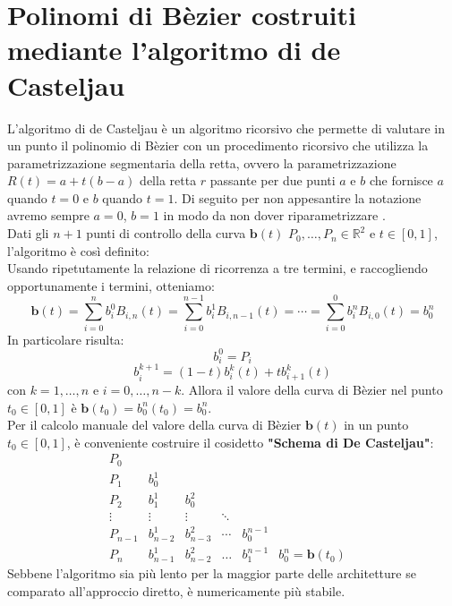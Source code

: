 \documentclass[a4paper,12pt]{report}
\theoremstyle{definition}
\begin{document}
\section{Polinomi di Bèzier costruiti mediante l'algoritmo di de Casteljau}\label{DeCasteljau}
L'algoritmo di de Casteljau è un algoritmo ricorsivo che permette di valutare in un punto il polinomio di Bèzier con un procedimento ricorsivo che utilizza la parametrizzazione segmentaria della retta, ovvero la parametrizzazione $R(t) = a + t(b - a)$ della retta $r$ passante per due punti $a$ e $b$ che fornisce $a$ quando $t=0$ e $b$ quando $t=1$.
Di seguito per non appesantire la notazione avremo sempre $a = 0 $,  $b = 1$ in modo da non dover riparametrizzare .\\
Dati gli $n+1$ punti di controllo della curva $\textbf{b}(t)$ $P_0, \ldots, P_n \in \mathbb{R}^2$ e $ t \in [0,1]$, l'algoritmo è così definito:\\
Usando ripetutamente la relazione di ricorrenza a tre termini, e raccogliendo opportunamente i termini, otteniamo:
$$\textbf{b}(t) = \sum_{i=0}^{n} b_{i}^0 B_{i,n}(t) = \sum_{i=0}^{n-1} b_{i}^1 B_{i,n-1}(t) = \cdots = \sum_{i=0}^{0} b_{i}^n B_{i,0}(t) = b_0^n$$
In particolare risulta:
$$b_i^0 = P_i $$ $$b_i^{k+1} = (1-t)b_i^{k}(t) + tb_{i+1}^{k}(t)$$ con $k = 1, \ldots, n$ e $i=0, \ldots, n-k$. Allora il valore della curva di Bèzier nel punto $t_0 \in [0,1]$ è $\textbf{b}(t_0) = b_0^n(t_0) = b_0^n$. \\
Per il calcolo manuale del valore della curva di Bèzier $\textbf{b}(t)$ in un punto $t_0 \in [0,1]$, è conveniente costruire il cosidetto \textbf{"Schema di De Casteljau"}:\\
$$\begin{matrix}
P_0&&&&&&\\
P_1 & b_0^1 \\
P_2 & b_1^1& b_0^2 \\
\vdots&\vdots & \vdots &\ddots \\
P_{n-1} & b_{n-2}^1 & b^2_{n-3} & \cdots & b_0^{n-1} \\
P_n & b_{n-1}^1 & b^2_{n-2} & \ldots & b_1^{n-1} & b_0^n = \textbf{b}(t_0)
\end{matrix}$$
Sebbene l'algoritmo sia più lento per la maggior parte delle architetture se comparato all'approccio diretto, è numericamente più stabile.
\end{document}
